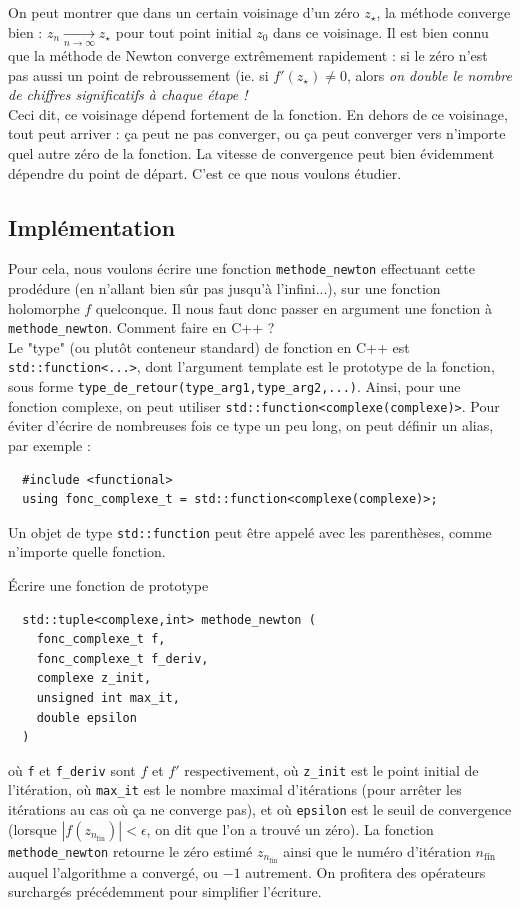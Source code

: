 \documentclass{book}
\newcommand{\inline}[1]{\texttt{#1}}
\begin{document}
On peut montrer que dans un certain voisinage d'un zéro $z_\star$, la méthode converge bien : $z_n \xrightarrow[n\to\infty]{} z_\star$ pour tout point initial $z_0$ dans ce voisinage. Il est bien connu que la méthode de Newton converge extrêmement rapidement : si le zéro n'est pas aussi un point de rebroussement (ie. si $f'(z_\star) \neq 0$, alors \emph{on double le nombre de chiffres significatifs à chaque étape !}\\

Ceci dit, ce voisinage dépend fortement de la fonction. En dehors de ce voisinage, tout peut arriver : ça peut ne pas converger, ou ça peut converger vers n'importe quel autre zéro de la fonction. La vitesse de convergence peut bien évidemment dépendre du point de départ. C'est ce que nous voulons étudier.\\

\subsection{Implémentation}

Pour cela, nous voulons écrire une fonction \inline{methode_newton} effectuant cette prodédure (en n'allant bien sûr pas jusqu'à l'infini...), sur une fonction holomorphe $f$ quelconque. Il nous faut donc passer en argument une fonction à \inline{methode_newton}. Comment faire en C++ ?\\

Le "type" (ou plutôt conteneur standard) de fonction en C++ est \inline{std::function<...>}, dont l'argument template est le prototype de la fonction, sous forme \inline{type_de_retour(type_arg1,type_arg2,...)}. Ainsi, pour une fonction complexe, on peut utiliser \inline{std::function<complexe(complexe)>}. Pour éviter d'écrire de nombreuses fois ce type un peu long, on peut définir un alias, par exemple :
\begin{verbatim}
  #include <functional>
  using fonc_complexe_t = std::function<complexe(complexe)>;
\end{verbatim}
Un objet de type \inline{std::function} peut être appelé avec les parenthèses, comme n'importe quelle fonction.

Écrire une fonction de prototype
\begin{verbatim}
  std::tuple<complexe,int> methode_newton (
    fonc_complexe_t f,
    fonc_complexe_t f_deriv,
    complexe z_init,
    unsigned int max_it,
    double epsilon
  )
\end{verbatim}
où \inline{f} et \inline{f_deriv} sont $f$ et $f'$ respectivement, où \inline{z_init} est le point initial de l'itération, où \inline{max_it} est le nombre maximal d'itérations (pour arrêter les itérations au cas où ça ne converge pas), et où \inline{epsilon} est le seuil de convergence (lorsque $|f(z_{n_\text{fin}})|<\epsilon$, on dit que l'on a trouvé un zéro). La fonction \inline{methode_newton} retourne le zéro estimé $z_{n_\text{fin}}$ ainsi que le numéro d'itération $n_\text{fin}$ auquel l'algorithme a convergé, ou $-1$ autrement. On profitera des opérateurs surchargés précédemment pour simplifier l'écriture.\\
\end{document}
